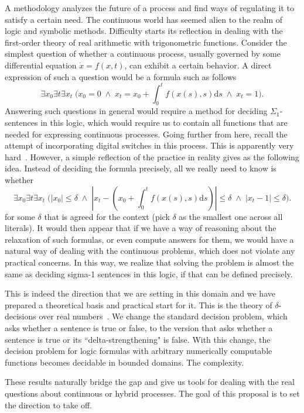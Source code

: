 \documentclass[10pt]{article}
\theoremstyle{definition}
\begin{document}
A methodology analyzes the future of a process and find ways of regulating it to satisfy a certain need. The continuous world has seemed alien to the realm of logic and symbolic methods. Difficulty starts its reflection in dealing with the first-order theory of real arithmetic with trigonometric functions. Consider the simplest question of whether a continuous process, usually governed by some differential equation $\dot{x} = f(x,t)$, can exhibit a certain behavior. A direct expression of such a question would be a formula such as follows
$$\exists x_0 \exists t \exists x_t\; \bigg(x_0 = 0 \;\wedge\; x_t = x_0 + \int_{0}^t f(x(s),s)\mathrm{d}s\; \wedge\; x_t = 1\bigg).$$
Answering such questions in general would require a method for deciding $\Sigma_1$-sentences in this logic, which would require us to contain all functions that are needed for expressing continuous processes. Going further from here, recall the attempt of incorporating digital switches in this process. This is apparently very hard~\cite{}. However, a simple reflection of the practice in reality gives as the following idea. Instead of deciding the formula precisely, all we really need to know is whether 
$$\exists x_0 \exists t \exists x_t\; \bigg(|x_0| \leq \delta \;\wedge\; |x_t - (x_0 + \int_{0}^t f(x(s),s)\mathrm{d}s)| \leq \delta\; \wedge\; |x_t - 1|\leq \delta\bigg).$$
for some $\delta$ that is agreed for the context (pick $\delta$ as the smallest one across all literals). It would then appear that if we have a way of reasoning about the relaxation of such formulas, or even compute answers for them, we would have a natural way of dealing with the continuous problems, which does not violate any practical concerns. In this way, we realize that solving the problem is almost the same as deciding sigma-1 sentences in this logic, if that can be defined precisely. 

This is indeed the direction that we are setting in this domain and we have prepared a theoretical basis and practical start for it. This is the theory of $\delta$-decisions over real numbers~\cite{}. We change the standard decision problem, which asks whether a sentence is true or false, to the version that asks whether a sentence is true or its ``delta-strengthening" is false. With this change, the decision problem for logic formulas with arbitrary numerically computable functions becomes decidable in bounded domains. The complexity. 

These results naturally bridge the gap and give us tools for dealing with the real questions about continuous or hybrid processes. The goal of this proposal is to set the direction to take off. 
\end{document}
